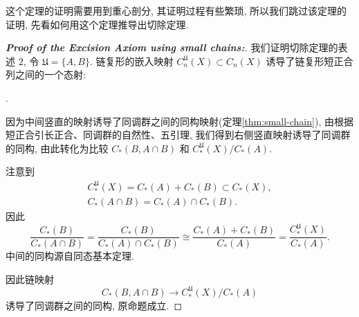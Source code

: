     这个定理的证明需要用到重心剖分, 其证明过程有些繁琐, 所以我们跳过该定理的证明, 先看如何用这个定理推导出切除定理.

    \begin{proof}[{\bf Proof of the Excision Axiom using small chains:}]\hfill
        
        我们证明切除定理的表述 $2$, 令 $\mathfrak{U} = \{A,B\}$. 链复形的嵌入映射 $C^{\mathfrak{U}}_n(X)\subset C_n(X)$ 诱导了链复形短正合列之间的一个态射:
        
        \vspace{8pt}
        .
        \vspace{8pt}

        因为中间竖直的映射诱导了同调群之间的同构映射(定理\ref{thm:small-chain}), 由根据短正合引长正合、同调群的自然性、五引理, 
        我们得到右侧竖直映射诱导了同调群的同构, 由此转化为比较 $C_*(B,A\cap B)$ 和 $C^{\mathfrak{U}}_{*}(X)/C_*(A)$.

        注意到
        \begin{gather*}
            C^{\mathfrak{U}}_{*}(X) = C_*(A)+C_*(B)\subset C_*(X), \\
            C_*(A\cap B) = C_*(A)\cap C_*(B).
        \end{gather*}
        因此
        \begin{equation*}
            \frac{C_*(B)}{C_*(A\cap B)}=\frac{C_*(B)}{C_*(A)\cap C_*(B)}\cong\frac{C_*(A)+C_*(B)}{C_*(A)}=\frac{C^{\mathfrak{U}}_{*}(X)}{C_*(A)}.
        \end{equation*}
        中间的同构源自同态基本定理. 

        因此链映射
        \begin{equation*}
            C_*(B,A\cap B)\rightarrow C_*^{\mathfrak{U}}(X)/C_*(A)
        \end{equation*}
        诱导了同调群之间的同构, 原命题成立.
    \end{proof}

